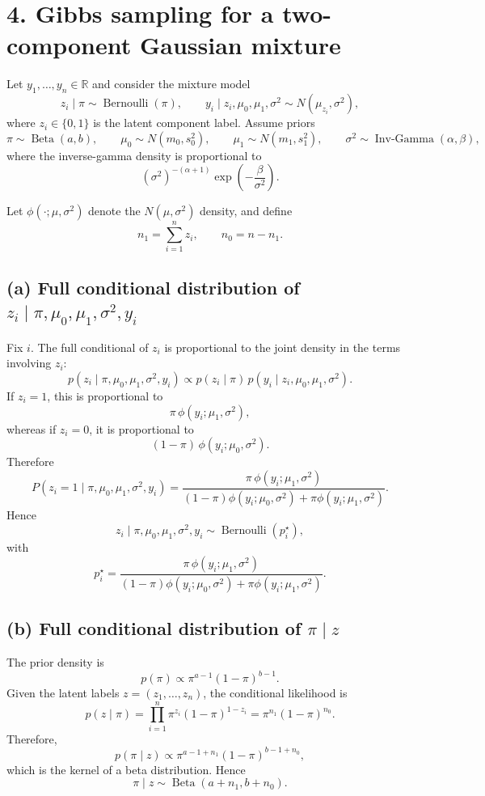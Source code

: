 \documentclass[11pt]{article}
\begin{document}
\newpage
\section*{4. Gibbs sampling for a two-component Gaussian mixture}

Let $y_1,\dots,y_n\in\mathbb R$ and consider the mixture model
\[
z_i\mid \pi\sim \operatorname{Bernoulli}(\pi),
\qquad
y_i\mid z_i,\mu_0,\mu_1,\sigma^2\sim N(\mu_{z_i},\sigma^2),
\]
where $z_i\in\{0,1\}$ is the latent component label. Assume priors
\[
\pi\sim \operatorname{Beta}(a,b),
\qquad
\mu_0\sim N(m_0,s_0^2),
\qquad
\mu_1\sim N(m_1,s_1^2),
\qquad
\sigma^2\sim \operatorname{Inv\text{-}Gamma}(\alpha,\beta),
\]
where the inverse-gamma density is proportional to
\[
(\sigma^2)^{-(\alpha+1)}\exp\left(-\frac{\beta}{\sigma^2}\right).
\]

Let $\phi(\cdot;\mu,\sigma^2)$ denote the $N(\mu,\sigma^2)$ density, and define
\[
n_1=\sum_{i=1}^n z_i,
\qquad n_0=n-n_1.
\]

\subsection*{(a) Full conditional distribution of $z_i\mid \pi,\mu_0,\mu_1,\sigma^2,y_i$}
Fix $i$. The full conditional of $z_i$ is proportional to the joint density in the terms involving $z_i$:
\[
p(z_i\mid \pi,\mu_0,\mu_1,\sigma^2,y_i)\propto p(z_i\mid\pi)\,p(y_i\mid z_i,\mu_0,\mu_1,\sigma^2).
\]
If $z_i=1$, this is proportional to
\[
\pi\,\phi(y_i;\mu_1,\sigma^2),
\]
whereas if $z_i=0$, it is proportional to
\[
(1-\pi)\,\phi(y_i;\mu_0,\sigma^2).
\]
Therefore
\[
P(z_i=1\mid \pi,\mu_0,\mu_1,\sigma^2,y_i)
=
\frac{\pi\,\phi(y_i;\mu_1,\sigma^2)}{(1-\pi)\phi(y_i;\mu_0,\sigma^2)+\pi\phi(y_i;\mu_1,\sigma^2)}.
\]
Hence
\[
z_i\mid \pi,\mu_0,\mu_1,\sigma^2,y_i \sim \operatorname{Bernoulli}(p_i^\star),
\]
with
\[
p_i^\star=
\frac{\pi\,\phi(y_i;\mu_1,\sigma^2)}{(1-\pi)\phi(y_i;\mu_0,\sigma^2)+\pi\phi(y_i;\mu_1,\sigma^2)}.
\]

\subsection*{(b) Full conditional distribution of $\pi\mid z$}
The prior density is
\[
p(\pi)\propto \pi^{a-1}(1-\pi)^{b-1}.
\]
Given the latent labels $z=(z_1,\dots,z_n)$, the conditional likelihood is
\[
p(z\mid\pi)=\prod_{i=1}^n \pi^{z_i}(1-\pi)^{1-z_i}=\pi^{n_1}(1-\pi)^{n_0}.
\]
Therefore,
\[
p(\pi\mid z)\propto \pi^{a-1+n_1}(1-\pi)^{b-1+n_0},
\]
which is the kernel of a beta distribution. Hence
\[
\pi\mid z\sim \operatorname{Beta}(a+n_1,b+n_0).
\]
\end{document}
